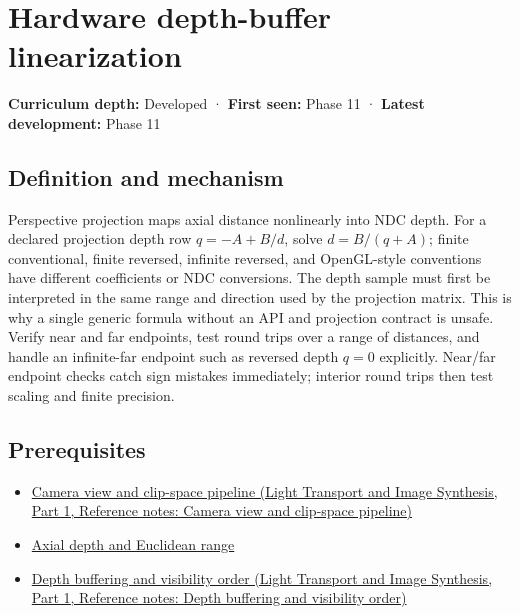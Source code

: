 \hypertarget{appendix-1bc40b08db4a}{}\label{referencestart:appendix-1bc40b08db4a}
\section{Hardware depth-buffer linearization}\label{appendix-1bc40b08db4a-hardware-depth-buffer-linearization}

\hypertarget{appendix-1bc40b08db4a-hardware-depth-buffer-linearization}{}

\textbf{Curriculum depth:} Developed · \textbf{First seen:} Phase 11 · \textbf{Latest development:} Phase 11

\begin{allmightroledefinition}

\subsection{Definition and mechanism}\label{appendix-1bc40b08db4a-definition-and-mechanism}

\hypertarget{appendix-1bc40b08db4a-definition-and-mechanism}{}

Perspective projection maps axial distance nonlinearly into NDC depth. For a declared projection depth row \(q=-A+B/d\), solve \(d=B/(q+A)\); finite conventional, finite reversed, infinite reversed, and OpenGL-style conventions have different coefficients or NDC conversions. The depth sample must first be interpreted in the same range and direction used by the projection matrix. This is why a single generic formula without an API and projection contract is unsafe. Verify near and far endpoints, test round trips over a range of distances, and handle an infinite-far endpoint such as reversed depth \(q=0\) explicitly. Near/far endpoint checks catch sign mistakes immediately; interior round trips then test scaling and finite precision.

\end{allmightroledefinition}

\subsection{Prerequisites}\label{appendix-1bc40b08db4a-prerequisites}

\hypertarget{appendix-1bc40b08db4a-prerequisites}{}

\begin{itemize}
\tightlist
\item
  \href{../04-Light-Transport-and-Image-Synthesis-P01/main.pdf\#appendix-1c07d64f5e70}{Camera view and clip-space pipeline (Light Transport and Image Synthesis, Part 1, Reference notes: Camera view and clip-space pipeline)}
\item
  \hyperref[appendix-cac01ebeeb11]{Axial depth and Euclidean range}
\item
  \href{../04-Light-Transport-and-Image-Synthesis-P01/main.pdf\#appendix-97578ed97952}{Depth buffering and visibility order (Light Transport and Image Synthesis, Part 1, Reference notes: Depth buffering and visibility order)}
\end{itemize}

